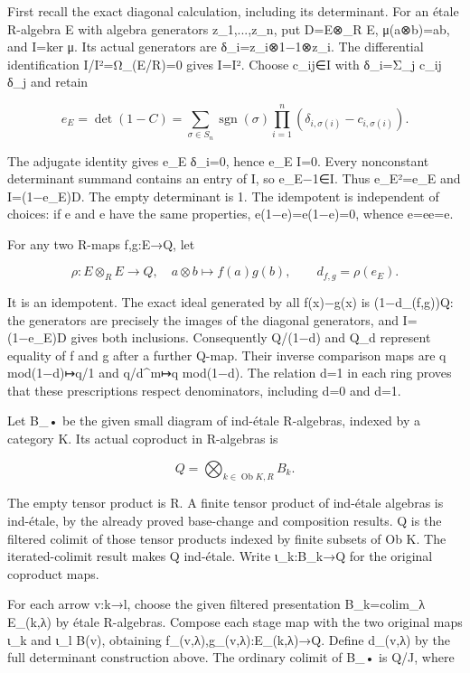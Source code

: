 First recall the exact diagonal calculation, including its determinant. For an étale R-algebra E with algebra generators z\_1,...,z\_n, put D=E⊗\_R E, μ(a⊗b)=ab, and I=ker μ. Its actual generators are δ\_i=z\_i⊗1−1⊗z\_i. The differential identification I/I²=Ω\_(E/R)=0 gives I=I². Choose c\_ij∈I with δ\_i=Σ\_j c\_ij δ\_j and retain

\[
e_E=\det(1-C)
 =\sum_{\sigma\in S_n}\operatorname{sgn}(\sigma)
   \prod_{i=1}^n(\delta_{i,\sigma(i)}-c_{i,\sigma(i)}).
\]

The adjugate identity gives e\_E δ\_i=0, hence e\_E I=0. Every nonconstant determinant summand contains an entry of I, so e\_E−1∈I. Thus e\_E²=e\_E and I=(1−e\_E)D. The empty determinant is 1. The idempotent is independent of choices: if e and e\textquotesingle{} have the same properties, e(1−e\textquotesingle)=e\textquotesingle(1−e)=0, whence e=ee\textquotesingle=e\textquotesingle.

For any two R-maps f,g:E→Q, let

\[
\rho:E\otimes_RE\to Q,\quad a\otimes b\mapsto f(a)g(b),
\qquad d_{f,g}=\rho(e_E).
\]

It is an idempotent. The exact ideal generated by all f(x)−g(x) is (1−d\_(f,g))Q: the generators are precisely the images of the diagonal generators, and I=(1−e\_E)D gives both inclusions. Consequently Q/(1−d) and Q\_d represent equality of f and g after a further Q-map. Their inverse comparison maps are q mod(1−d)↦q/1 and q/d\^{}m↦q mod(1−d). The relation d=1 in each ring proves that these prescriptions respect denominators, including d=0 and d=1.

Let B\_• be the given small diagram of ind-étale R-algebras, indexed by a category K. Its actual coproduct in R-algebras is

\[
Q=\bigotimes_{k\in\operatorname{Ob}K,R} B_k.
\]

The empty tensor product is R. A finite tensor product of ind-étale algebras is ind-étale, by the already proved base-change and composition results. Q is the filtered colimit of those tensor products indexed by finite subsets of Ob K. The iterated-colimit result makes Q ind-étale. Write ι\_k:B\_k→Q for the original coproduct maps.

For each arrow v:k→l, choose the given filtered presentation B\_k=colim\_λ E\_(k,λ) by étale R-algebras. Compose each stage map with the two original maps ι\_k and ι\_l B(v), obtaining f\_(v,λ),g\_(v,λ):E\_(k,λ)→Q. Define d\_(v,λ) by the full determinant construction above. The ordinary colimit of B\_• is Q/J, where

